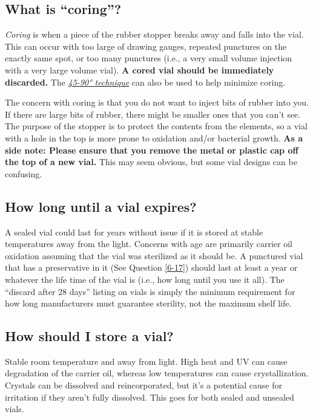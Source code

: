 \documentclass{article}
\begin{document}
{{\subsection{What is “coring”?}\label{5-23}

\textit{Coring} is when a piece of the rubber stopper breaks away and falls into the vial. This can occur with too large of drawing gauges, repeated punctures on the exactly same spot, or too many punctures (i.e., a very small volume injection with a very large volume vial). \textbf{A cored vial should be immediately discarded. }The \href{https://www.youtube.com/watch?v=w5F0SLoMjC8}{\textit{45-90° technique}} can also be used to help minimize coring.

The concern with coring is that you do not want to inject bits of rubber into you. If there are large bits of rubber, there might be smaller ones that you can't see. The purpose of the stopper is to protect the contents from the elements, so a vial with a hole in the top is more prone to oxidation and/or bacterial growth. \textbf{As a side note: Please ensure that you remove the metal or plastic cap off the top of a new vial. }This may seem obvious, but some vial designs can be confusing. 

\subsection{How long until a vial expires?}

A sealed vial could last for years without issue if it is stored at stable temperatures away from the light. Concerns with age are primarily carrier oil oxidation assuming that the vial was sterilized as it should be. A punctured vial that has a preservative in it (See Question \ref{6-17}) should last at least a year or whatever the life time of the vial is (i.e., how long until you use it all). The “discard after 28 days” listing on vials is simply the minimum requirement for how long manufacturers must guarantee sterility, not the maximum shelf life. 

\subsection{How should I store a vial?}

Stable room temperature and away from light. High heat and UV can cause degradation of the carrier oil, whereas low temperatures can cause crystallization. Crystals can be dissolved and reincorporated, but it’s a potential cause for irritation if they aren’t fully dissolved. This goes for both sealed and unsealed vials.

}}
\end{document}
